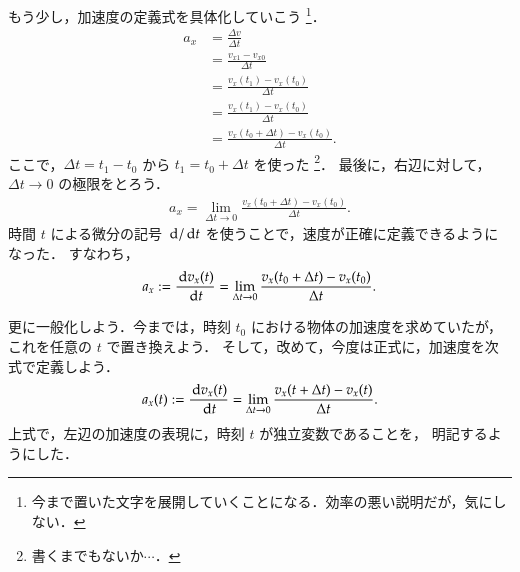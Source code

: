             もう少し，加速度の定義式を具体化していこう
                \footnote{
                    今まで置いた文字を展開していくことになる．効率の悪い説明だが，気にしない．
                }．
                \begin{align*}
                    a_{x} &= \frac{\Delta v}{\Delta t}                     \\
                          &= \frac{v_{x1} - v_{x0}}{\Delta t}              \\
                          &= \frac{v_{x}(t_{1}) - v_{x}(t_{0})}{\Delta t}  \\
                          &= \frac{v_{x}(t_{1}) - v_{x}(t_{0})}{\Delta t}  \\
                          &= \frac{v_{x}(t_{0}+\Delta  t) - v_{x}(t_{0})}{\Delta t}.
                \end{align*}
            ここで，$\Delta t = t_{1} - t_{0}$ から $t_{1} = t_{0}+\Delta  t$ を使った
                \footnote{
                    書くまでもないか$\cdots$．
                }．
            最後に，右辺に対して，$\Delta t \rightarrow 0$ の極限をとろう．
                \begin{align}
                    a_{x} = \lim_{\Delta t \rightarrow 0}
                            \frac{v_{x}(t_{0}+\Delta t) - v_{x}(t_{0})}{\Delta t}.
                \end{align}
            時間 $t$ による微分の記号 $\,\mathrm{d}/\,\mathrm{d} t$ を使うことで，速度が正確に定義できるようになった．
            すなわち，
                \begin{align}
                    a_{x}    :=\frac{\,\mathrm{d} v_{x}(t)}{\,\mathrm{d} t}
                              =\lim_{\Delta t \rightarrow 0}
                               \frac{v_{x}(t_{0}+\Delta t) - v_{x}(t_{0})}{\Delta t}.
                \end{align}

            更に一般化しよう．今までは，時刻 $t_{0}$ における物体の加速度を求めていたが，
            これを任意の $t$ で置き換えよう．
            そして，改めて，今度は正式に，加速度を次式で定義しよう．
                \begin{align}
                    a_{x}(t) :=\frac{\,\mathrm{d} v_{x}(t)}{\,\mathrm{d} t}
                              =\lim_{\Delta t \rightarrow 0}
                               \frac{v_{x}(t+\Delta t) - v_{x}(t)}{\Delta t}.
                \end{align}
            上式で，左辺の加速度の表現に，時刻 $t$ が独立変数であることを，
            明記するようにした．

